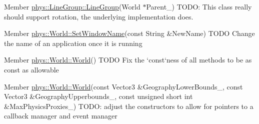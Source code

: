 \label{dd/da0/todo__todo000011}
\hypertarget{dd/da0/todo__todo000011}{}
 
\begin{DoxyDescription}
\item[Member \hyperlink{classphys_1_1LineGroup_a676039a6beec56d24c631e9da5fd7e76}{phys::LineGroup::LineGroup}(World $\ast$Parent\_\-) ]TODO: This class really should support rotation, the underlying implementation does. 
\end{DoxyDescription}

\label{dd/da0/todo__todo000021}
\hypertarget{dd/da0/todo__todo000021}{}
 
\begin{DoxyDescription}
\item[Member \hyperlink{classphys_1_1World_acd0dff342c08fe3008226488b7c53d97}{phys::World::SetWindowName}(const String \&NewName) ]TODO Change the name of an application once it is running 
\end{DoxyDescription}

\label{dd/da0/todo__todo000016}
\hypertarget{dd/da0/todo__todo000016}{}
 
\begin{DoxyDescription}
\item[Member \hyperlink{classphys_1_1World_a7f762724406c874250c3dc8910a1e695}{phys::World::World}() ]TODO Fix the `const`ness of all methods to be as const as allowable 
\end{DoxyDescription}

\label{dd/da0/todo__todo000017}
\hypertarget{dd/da0/todo__todo000017}{}
 
\begin{DoxyDescription}
\item[Member \hyperlink{classphys_1_1World_aa74e4e6053044c3ecec87fdbf7880c18}{phys::World::World}(const Vector3 \&GeographyLowerBounds\_\-, const Vector3 \&GeographyUpperbounds\_\-, const unsigned short int \&MaxPhysicsProxies\_\-=1024) ]TODO: adjust the constructors to allow for pointers to a callback manager and event manager 
\end{DoxyDescription}